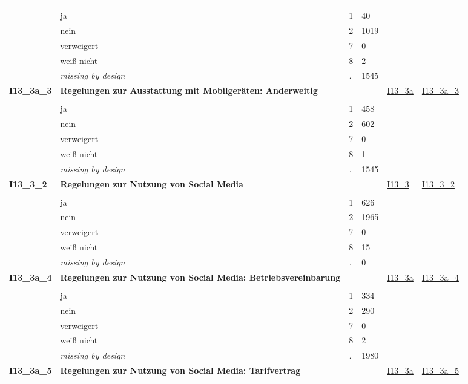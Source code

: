 \begin{longtable}{| L{2.45cm} | L{6cm} | C{1.5cm} | R{1cm} | C{2.25cm} | C{2.25cm} |}
   &  &  &  &  &  \\ 
   & ja & 1 & 40 &  &  \\ 
   & nein & 2 & 1019 &  &  \\ 
   & verweigert & 7 & 0 &  &  \\ 
   & weiß nicht & 8 & 2 &  &  \\ 
   & \textit{missing by design} & \textit{.} & 1545 &  &  \\ 
   \midrule
\textbf{I13\_3a\_3}\label{var:I13:3a:3} & \textbf{Regelungen zur Ausstattung mit Mobilgeräten: Anderweitig} &  &  & \hyperref[I13:3a]{I13\_3a} & \hyperref[var:suf:I13:3a:3]{I13\_3a\_3} \\ 
   &  &  &  &  &  \\ 
   & ja & 1 & 458 &  &  \\ 
   & nein & 2 & 602 &  &  \\ 
   & verweigert & 7 & 0 &  &  \\ 
   & weiß nicht & 8 & 1 &  &  \\ 
   & \textit{missing by design} & \textit{.} & 1545 &  &  \\ 
   \midrule
\textbf{I13\_3\_2}\label{var:I13:3:2} & \textbf{Regelungen zur Nutzung von Social Media} &  &  & \hyperref[I13:3]{I13\_3} & \hyperref[var:suf:I13:3:2]{I13\_3\_2} \\ 
   &  &  &  &  &  \\ 
   & ja & 1 & 626 &  &  \\ 
   & nein & 2 & 1965 &  &  \\ 
   & verweigert & 7 & 0 &  &  \\ 
   & weiß nicht & 8 & 15 &  &  \\ 
   & \textit{missing by design} & \textit{.} & 0 &  &  \\ 
   \midrule
\textbf{I13\_3a\_4}\label{var:I13:3a:4} & \textbf{Regelungen zur Nutzung von Social Media: Betriebsvereinbarung} &  &  & \hyperref[I13:3a]{I13\_3a} & \hyperref[var:suf:I13:3a:4]{I13\_3a\_4} \\ 
   &  &  &  &  &  \\ 
   & ja & 1 & 334 &  &  \\ 
   & nein & 2 & 290 &  &  \\ 
   & verweigert & 7 & 0 &  &  \\ 
   & weiß nicht & 8 & 2 &  &  \\ 
   & \textit{missing by design} & \textit{.} & 1980 &  &  \\ 
   \midrule
\textbf{I13\_3a\_5}\label{var:I13:3a:5} & \textbf{Regelungen zur Nutzung von Social Media: Tarifvertrag} &  &  & \hyperref[I13:3a]{I13\_3a} & \hyperref[var:suf:I13:3a:5]{I13\_3a\_5} \\ 

\end{longtable}
